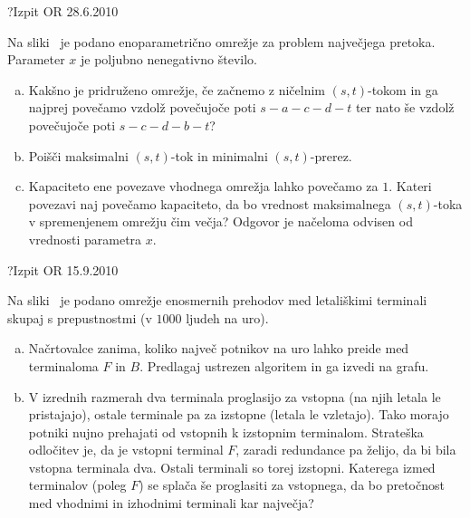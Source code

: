 \begin{naloga}{?}{Izpit OR 28.6.2010}
\begin{vprasanje}[pretokx]
Na sliki~\fig{} je podano enoparametrično omrežje
za problem največjega pretoka.
Parameter $x$ je poljubno nenegativno število.

\begin{enumerate}[(a)]
\item Kakšno je pridruženo omrežje,
če začnemo z ničelnim $(s, t)$-tokom
in ga najprej povečamo vzdolž povečujoče poti $s-a-c-d-t$
ter nato še vzdolž povečujoče poti $s-c-d-b-t$?

\item Poišči maksimalni $(s, t)$-tok in minimalni $(s, t)$-prerez.

\item Kapaciteto ene povezave vhodnega omrežja lahko povečamo za $1$.
Kateri povezavi naj povečamo kapaciteto,
da bo vrednost maksimalnega $(s, t)$-toka v spremenjenem omrežju čim večja?
Odgovor je načeloma odvisen od vred\-no\-sti parametra $x$.
\end{enumerate}

\begin{slika}
\pgfslika
{}
\end{slika}
\end{vprasanje}
\begin{odgovor}
\end{odgovor}
\end{naloga}


\begin{naloga}{?}{Izpit OR 15.9.2010}
\begin{vprasanje}[terminali]
Na sliki~\fig{} je podano omrežje enosmernih prehodov
med letališkimi terminali skupaj s prepustnostmi (v $1000$ ljudeh na uro).

\begin{enumerate}[(a)]
\item Načrtovalce zanima,
koliko največ potnikov na uro lahko preide med terminaloma $F$ in $B$.
Predlagaj ustrezen algoritem in ga izvedi na grafu.

\item V izrednih razmerah dva terminala proglasijo za vstopna
(na njih letala le pristajajo),
ostale terminale pa za izstopne (letala le vzletajo).
Tako morajo potniki nujno prehajati od vstopnih k izstopnim terminalom.
Strateška odločitev je, da je vstopni terminal $F$,
zaradi redundance pa želijo, da bi bila vstopna terminala dva.
Ostali terminali so torej izstopni.
Katerega izmed terminalov (poleg $F$) se splača še proglasiti za vstopnega,
da bo pretočnost med vhodnimi in izhodnimi terminali kar največja?
\end{enumerate}

\begin{slika}
\pgfslika
{}
\end{slika}
\end{vprasanje}
\begin{odgovor}
\end{odgovor}
\end{naloga}


